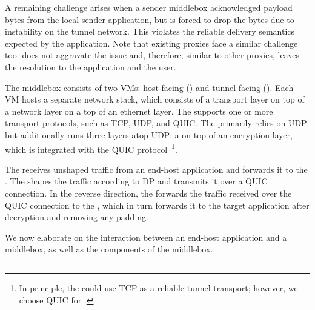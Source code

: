 A remaining challenge arises when a sender middlebox acknowledged payload bytes
from the local sender application, but is forced to drop the bytes due to
instability on the tunnel network. This violates the reliable delivery semantics
expected by the application. Note that existing proxies face a similar challenge
too. {\sys} does not aggravate the issue and, therefore, similar to other
proxies, leaves the resolution to the application and the user.
\fi






The middlebox consists of two VMs: host-facing ({\unshapedVM}) and
tunnel-facing ({\shapedVM}). Each VM hosts a separate network stack, which
consists of a transport layer on top of a
network layer on a top of an ethernet layer. The {\unshapedVM} supports one or
more transport protocols, such as TCP, UDP, and QUIC.
The {\shapedVM} primarily relies on UDP but additionally runs three layers atop
UDP: a {\DPlogic} on top of an encryption layer, which is integrated with the
QUIC protocol~\cite{langley2017quic}\footnote{In principle, the {\shapedVM} could use
TCP as a
    reliable tunnel transport; however, we choose QUIC for .}.

The {\unshapedVM} receives unshaped traffic from an
end-host application and forwards it to the {\shapedVM}. The {\DPlogic} shapes
the traffic according to DP and transmits it over a QUIC connection. In the
reverse direction, the {\shapedVM} forwards the traffic received over the QUIC
connection to
the {\unshapedVM}, which in turn forwards it to the target application after
decryption and removing any padding.

We now elaborate on the interaction between an end-host application and a
middlebox, as well as the components of the middlebox.

\subsection{\unshapedVM}
%

